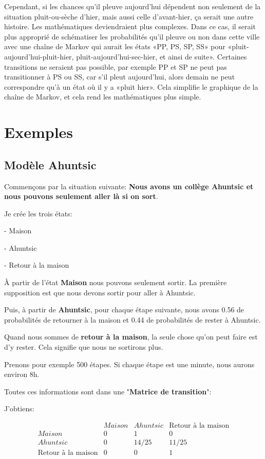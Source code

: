 \documentclass[10pt]{article}
\begin{document}
Cependant, si les chances qu'il pleuve aujourd'hui dépendent non seulement de la situation pluit-ou-sèche d'hier, mais aussi celle d'avant-hier, ça serait une autre histoire. Les mathématiques deviendraient plus complexes. Dans ce cas, il serait plus approprié de schématiser les probabilités qu'il pleuve ou non dans cette ville avec une chaîne de Markov qui aurait les états «PP, PS, SP, SS» pour «pluit-aujourd'hui-pluit-hier, pluit-aujourd'hui-sec-hier, et ainsi de suite». Certaines transitions ne seraient pas possible, par exemple PP et SP ne peut pas transitionner à PS ou SS, car s'il pleut aujourd'hui, alors demain ne peut correspondre qu'à un état où il y a «pluit hier».  Cela simplifie le graphique de la chaîne de Markov, et cela rend les mathématiques plus simple.


\section{Exemples}

\subsection{Modèle Ahuntsic}


Commençons par la situation suivante: \textbf{Nous avons un collège Ahuntsic et nous pouvons seulement aller là si on sort}.

Je crée les trois états:

- Maison


- Ahuntsic


- Retour à la maison

À partir de l'état \textbf{Maison} nous pouvons seulement sortir. La première supposition est que nous devons sortir pour aller à Ahuntsic.

Puis, à partir de \textbf{Ahuntsic},  pour chaque étape suivante, nous avons 0.56 de probabilités de retourner à la maison et 0.44 de probabilités de rester à Ahuntsic.

Quand nous sommes de \textbf{retour à la maison}, la seule chose qu'on peut faire est d'y rester. Cela signifie que nous ne sortirons plus.

Prenons pour exemple 500 étapes. Si chaque étape est une minute, nous aurons environ 8h.

Toutes ces informations sont dans une "\textbf{Matrice de transition}":

J'obtiens:


\[
        \begin{array}{c|ccc}
	& Maison & Ahuntsic & \text{Retour à la maison}\\
	\hline
	Maison & 0 & 1 & 0\\
	Ahuntsic & 0 & 14/25 & 11/25\\
	\text{Retour à la maison} & 0 & 0 & 1\\
	\end{array}
\]
\end{document}
